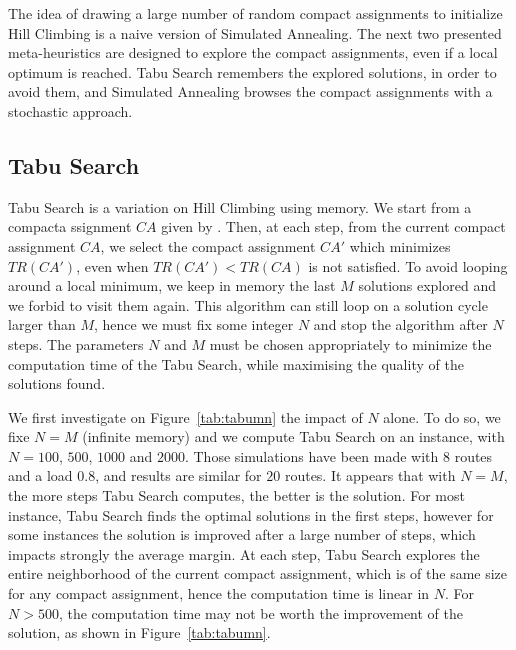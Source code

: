  The idea of drawing a large number of random compact assignments to initialize Hill Climbing is a naive version of Simulated Annealing. The next two presented meta-heuristics are designed to explore the compact assignments, even if a local optimum is reached. Tabu Search remembers the explored solutions, in order to avoid them, and Simulated Annealing browses the compact assignments with a stochastic approach.

\subsection{Tabu Search}

Tabu Search is a variation on Hill Climbing using memory. We start from a compacta ssignment $CA$ given by \hybridgreedynormalized. Then, at each step, from the current compact assignment $CA$, we select the compact assignment $CA'$ which minimizes $TR(CA')$, even when $TR(CA') < TR(CA)$ is not satisfied. To avoid looping around a local minimum, we keep in memory the last $M$ solutions explored and we forbid to visit them again. This algorithm can still loop on a solution cycle larger than $M$, hence we must fix some integer $N$ and stop the algorithm after $N$ steps.
The parameters $N$ and $M$ must be chosen appropriately to minimize the computation time of the Tabu Search, while maximising the quality of the solutions found. 

We first investigate on Figure~\ref{tab:tabumn} the impact of $N$ alone. To do so, we fixe $N = M$ (infinite memory) and we compute  Tabu Search on an instance, with $N = 100$, $500$, $1000$ and $2000$. Those simulations have been made with $8$ routes and a load $0.8$, and results are similar for $20$ routes. It appears that with $N=M$, the more steps Tabu Search computes, the better is the solution. For most instance, Tabu Search finds the optimal solutions in the first steps, however for some instances the solution is improved after a large number of steps, which impacts strongly the average margin. At each step, Tabu Search explores the entire neighborhood of the current compact assignment,
which is of the same size for any compact assignment, hence the computation time is linear in $N$. For $N > 500$, the computation time may not be worth the improvement of the solution, as shown in Figure~\ref{tab:tabumn}.



